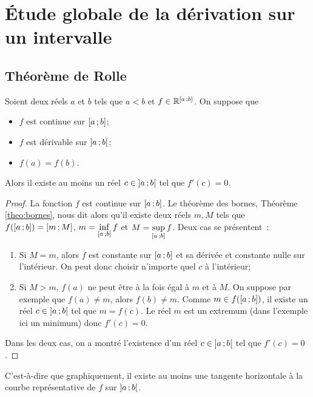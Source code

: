 \section{Étude globale de la dérivation sur un intervalle}

\subsection{Théorème de Rolle}

\begin{theo}
  Soient deux réels \(a\) et \(b\) tels que \(a < b\) et \(f \in \mathbb{R}^{\left[ a \, ;  b \right]}\). On suppose que
  \begin{itemize}
  \item \(f\) est continue sur \(\left[ a \, ;  b \right]\);
  \item \(f\) est dérivable sur \(\left] a \, ;  b \right[\);
  \item \(f(a)=f(b)\).
  \end{itemize}
  Alors il existe au moins un réel \(c \in \left] a \, ;  b \right[\) tel que \(f'(c)=0\).
\end{theo}
\begin{proof}
  La fonction \(f\) est continue sur \(\left[ a \, ;  b \right]\). Le théorème des bornes, Théorème
\ref{theo:bornes}, nous dit alors qu'il existe deux réels \(m,M\) tels que \(f(\left[ a \, ;  b \right])=\left[ m \, ;  M \right]\), \(m = \inf\limits_{\left[ a \, ;  b \right]} f\) et \(M = \sup\limits_{\left[ a \, ;  b \right]} f\). Deux cas se présentent~:
  \begin{enumerate}
  \item Si \(M=m\), alors \(f\) est constante sur \(\left[ a \, ;  b \right]\) et sa dérivée et constante nulle sur l'intérieur. On peut donc choisir n'importe quel \(c\) à l'intérieur;
  \item Si \(M > m\), \(f(a)\) ne peut être à la fois égal à \(m\) et à \(M\). On suppose par exemple que \(f(a) \neq m\), alors \(f(b) \neq m\). Comme \(m \in f(\left[ a \, ;  b \right])\), il existe un réel \(c \in \left] a \, ;  b \right[\) tel que \(m=f(c)\). Le réel \(m\) est un extremum (dans l'exemple ici un minimum) donc \(f'(c)=0\).
  \end{enumerate}
  Dans les deux cas, on a montré l'existence d'un réel \(c \in \left] a \, ;  b \right[\) tel que \(f'(c)=0\).
\end{proof}

C'est-à-dire que graphiquement, il existe au moins une tangente horizontale à la courbe représentative de \(f\) sur \(\left] a \, ;  b \right[\).

